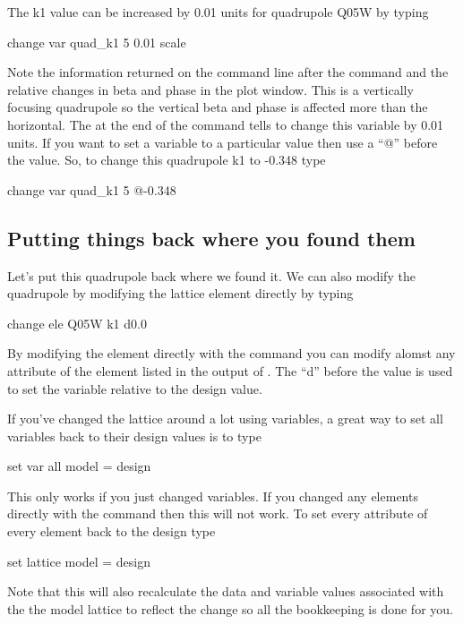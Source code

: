 The k1 value can be increased by 0.01 units for quadrupole Q05W by typing
\begin{example}
  change var quad\_k1 5 0.01
  scale
\end{example}
Note the information returned on the command line after the command and the relative changes in
beta and phase in the plot window. This is a vertically focusing quadrupole so
the vertical beta and phase is affected more than the horizontal. The 
at the end of the command tells \tao to change this variable by 0.01 units. If
you want to set a variable to a particular value then use a ``@'' before the
value. So, to change this quadrupole k1 to -0.348 type
\begin{example}
  change var quad\_k1 5 @-0.348
\end{example}

\subsection{Putting things back where you found them}
\label{ss:put_it_back}

Let's put this quadrupole back where we found it. We can also modify the quadrupole
by modifying the lattice element directly by typing
\begin{example}
  change ele Q05W k1 d0.0
\end{example}
By modifying the element directly with the  command you can
modify alomst any attribute of the element listed in the output of .
The ``d'' before the value is used to set the variable relative to the design value.

If you've changed the lattice around a lot using variables, a great way to set
all variables back to their design values is to type
\begin{example}
  set var all model = design
\end{example}
This only works if you just changed variables. If you changed any elements
directly with the  command then this will not work. To set
every attribute of every element back to the design type
\begin{example}
  set lattice model = design
\end{example}
Note that this will also recalculate the data and variable values associated with the
the model lattice to reflect the change so all the bookkeeping is done for you.


